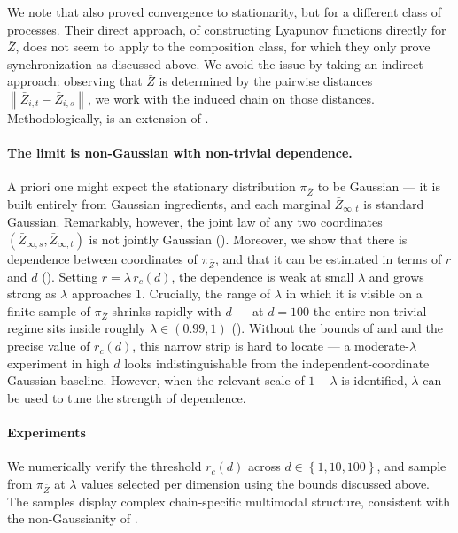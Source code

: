 \documentclass{article}
\newcommand{\Set}[1]{\left\{ #1 \right\}}
\newcommand{\norm}[1]{\left\|#1\right\|}
\newcommand{\bZ}{\bar{Z}}
\begin{document}
We note that \citet{dunlop2018how} also proved convergence to stationarity, but for a different class of processes. Their direct approach, of constructing Lyapunov functions directly for $\bZ$, does not seem to apply to the composition class, for which they only prove synchronization as discussed above. We avoid the issue by taking an indirect approach: observing that $\bZ$ is determined by the pairwise distances $\norm{\bZ_{i,t} - \bZ_{i,s}}$, we work with the induced chain on those distances. Methodologically,  is an extension of .

\paragraph{The limit is non-Gaussian with non-trivial dependence.}
A priori one might expect the stationary distribution $\pi_{\bZ}$ to be Gaussian --- it is built entirely from Gaussian ingredients, and each marginal $\bZ_{\infty,t}$ is standard Gaussian. Remarkably, however, the joint law of any two coordinates $(\bZ_{\infty,s}, \bZ_{\infty,t})$ is not jointly Gaussian ().
Moreover, we show that there is dependence between coordinates of $\pi_{\bZ}$, and that it can be estimated in terms of $r$ and $d$ (). Setting $r = \lambda\, r_c(d)$, the dependence is weak at small $\lambda$ and grows strong as $\lambda$ approaches $1$. Crucially, the range of $\lambda$ in which it is visible on a finite sample of $\pi_{\bZ}$ shrinks rapidly with $d$ --- at $d = 100$ the entire non-trivial regime sits inside roughly $\lambda \in (0.99, 1)$ (). Without the bounds of  and  and the precise value of $r_c(d)$, this narrow strip is hard to locate --- a moderate-$\lambda$ experiment in high $d$ looks indistinguishable from the independent-coordinate Gaussian baseline. However, when the relevant scale of $1-\lambda$ is identified, $\lambda$ can be used to tune the strength of dependence. 

\paragraph{Experiments}
We numerically verify the threshold $r_c(d)$ across $d \in \Set{1, 10, 100}$, and sample from $\pi_{\bZ}$ at $\lambda$ values selected per dimension using the bounds discussed above. The samples display complex chain-specific multimodal structure, consistent with the non-Gaussianity of .
\end{document}
